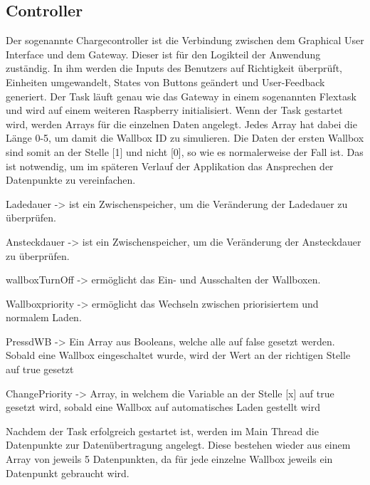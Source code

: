 \subsection{Controller} 



Der sogenannte Chargecontroller ist die Verbindung zwischen dem Graphical User Interface und dem Gateway. Dieser ist für den Logikteil der Anwendung zuständig. In ihm werden die Inputs des Benutzers auf Richtigkeit überprüft, Einheiten umgewandelt, States von Buttons geändert und User-Feedback generiert. Der Task läuft genau wie das Gateway in einem sogenannten Flextask und wird auf einem weiteren Raspberry initialisiert. Wenn der Task gestartet wird, werden Arrays für die einzelnen Daten angelegt. Jedes Array hat dabei die Länge 0-5, um damit die Wallbox ID zu simulieren. Die Daten der ersten Wallbox sind somit an der Stelle [1] und nicht [0], so wie es normalerweise der Fall ist. Das ist notwendig, um im späteren Verlauf der Applikation das Ansprechen der Datenpunkte zu vereinfachen.
\begin{compactitem}
\item Ladedauer -> ist ein Zwischenspeicher, um die Veränderung der Ladedauer zu überprüfen.
\item Ansteckdauer -> ist ein Zwischenspeicher, um die Veränderung der Ansteckdauer zu überprüfen.
\item wallboxTurnOff -> ermöglicht das Ein- und Ausschalten der Wallboxen.
\item Wallboxpriority -> ermöglicht das Wechseln zwischen priorisiertem und normalem Laden.
\item PressdWB -> Ein Array aus Booleans, welche alle auf false gesetzt werden. Sobald eine Wallbox eingeschaltet wurde, wird der Wert an der richtigen Stelle auf true gesetzt
\item ChangePriority -> Array, in welchem die Variable an der Stelle [x] auf true gesetzt wird, sobald eine Wallbox auf automatisches Laden gestellt wird
\end{compactitem}


Nachdem der Task erfolgreich gestartet ist, werden im Main Thread die Datenpunkte zur Datenübertragung angelegt. Diese bestehen wieder aus einem Array von jeweils 5 Datenpunkten, da für jede einzelne Wallbox jeweils ein Datenpunkt gebraucht wird.


